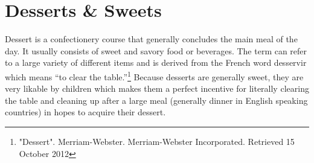 \AddToShipoutPicture*{\AppleTartLarge}
\chapter{Desserts \& Sweets}

Dessert is a confectionery course that generally concludes the main meal of the day. It usually consists of sweet and savory food or beverages. The term can refer to a large variety of different items and is derived from the French word desservir which means ``to clear the table.''\footnote{"Dessert". Merriam-Webster. Merriam-Webster Incorporated. Retrieved 15 October 2012} Because desserts are generally sweet, they are very likable by children which makes them a perfect incentive for literally clearing the table and cleaning up after a large meal (generally dinner in English speaking countries) in hopes to acquire their dessert.